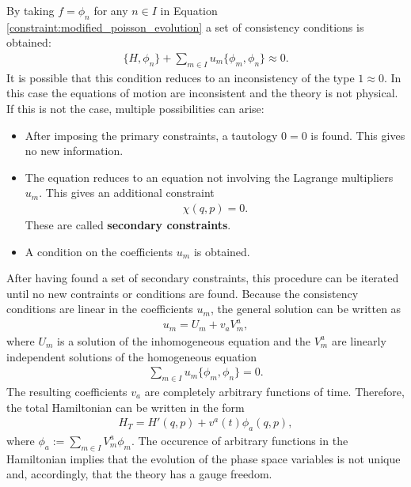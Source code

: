     \begin{property}
        By taking $f=\phi_n$ for any $n\in I$ in Equation \eqref{constraint:modified_poisson_evolution} a set of consistency conditions is obtained:
        \begin{gather}
            \{H,\phi_n\} + \sum_{m\in I}u_m\{\phi_m,\phi_n\}\approx 0.
        \end{gather}
        It is possible that this condition reduces to an inconsistency of the type $1\approx0$. In this case the equations of motion are inconsistent and the theory is not physical. If this is not the case, multiple possibilities can arise:
        \begin{itemize}
            \item After imposing the primary constraints, a tautology $0=0$ is found. This gives no new information.
            \item The equation reduces to an equation not involving the Lagrange multipliers $u_m$. This gives an additional constraint
                \begin{gather}
                    \chi(q,p)=0.
                \end{gather}
                These are called \textbf{secondary constraints}.
            \item A condition on the coefficients $u_m$ is obtained.
        \end{itemize}
        After having found a set of secondary constraints, this procedure can be iterated until no new contraints or conditions are found. Because the consistency conditions are linear in the coefficients $u_m$, the general solution can be written as
        \begin{gather}
            u_m = U_m + v_aV^a _m,
        \end{gather}
        where $U_m$ is a solution of the inhomogeneous equation and the $V^a_m$ are linearly independent solutions of the homogeneous equation
        \begin{gather}
            \sum_{m\in I}u_m\{\phi_m,\phi_n\} = 0.
        \end{gather}
        The resulting coefficients $v_a$ are completely arbitrary functions of time. Therefore, the total Hamiltonian can be written in the form
        \begin{gather}
            H_T = H'(q,p) + v^a(t)\phi_a(q,p),
        \end{gather}
        where $\phi_a := \sum_{m\in I}V^a_m\phi_m$. The occurence of arbitrary functions in the Hamiltonian implies that the evolution of the phase space variables is not unique and, accordingly, that the theory has a gauge freedom.
    \end{property}

